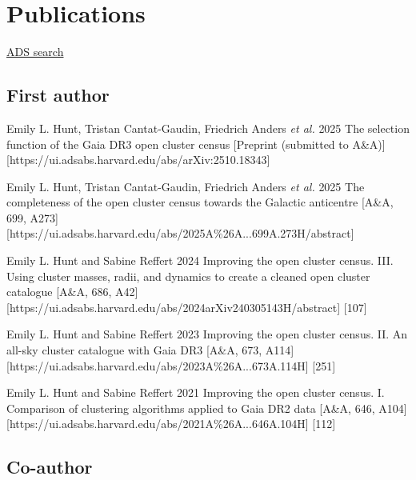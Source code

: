 \section*{Publications}

\href{\cvADSLink}{ADS search \faLink}%


\subsection*{First author}

\begin{etaremune}
    \item \publication
        {Emily L. Hunt, Tristan Cantat-Gaudin, Friedrich Anders \emph{et al.}}
        {2025}
        {The selection function of the Gaia DR3 open cluster census}
        [Preprint (submitted to A\&A)]
        [https://ui.adsabs.harvard.edu/abs/arXiv:2510.18343]
    \item \publication
        {Emily L. Hunt, Tristan Cantat-Gaudin, Friedrich Anders \emph{et al.}}
        {2025}
        {The completeness of the open cluster census towards the Galactic anticentre}
        [A\&A, 699, A273]
        [https://ui.adsabs.harvard.edu/abs/2025A\%26A...699A.273H/abstract]
    \item \publication
        {Emily L. Hunt and Sabine Reffert}
        {2024}
        {Improving the open cluster census. III. Using cluster masses, radii, and dynamics to create a cleaned open cluster catalogue}
        [A\&A, 686, A42]
        [https://ui.adsabs.harvard.edu/abs/2024arXiv240305143H/abstract]
        [107]
    \item \publication
        {Emily L. Hunt and Sabine Reffert}
        {2023}
        {Improving the open cluster census. II. An all-sky cluster catalogue with Gaia DR3}
        [A\&A, 673, A114]
        [https://ui.adsabs.harvard.edu/abs/2023A\%26A...673A.114H]
        [251]
    \item \publication
        {Emily L. Hunt and Sabine Reffert}
        {2021}
        {Improving the open cluster census. I. Comparison of clustering algorithms applied to Gaia DR2 data}
        [A\&A, 646, A104]
        [https://ui.adsabs.harvard.edu/abs/2021A\%26A...646A.104H]
        [112]
\end{etaremune}


\subsection*{Co-author}

